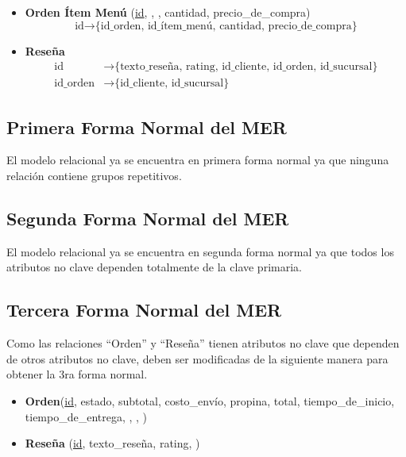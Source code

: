 \begin{itemize}
    \item \textbf{Orden Ítem Menú} (\underline{id}, , , cantidad, precio\_de\_compra)
    \[\text{id} \rightarrow \text{\{id\_orden, id\_ítem\_menú, cantidad, precio\_de\_compra\}}\]
    
    \item \textbf{Reseña}
    \begin{align*}
        \text{id} &\rightarrow \text{\{texto\_reseña, rating, id\_cliente, id\_orden, id\_sucursal\}} \\
        \text{id\_orden} &\rightarrow \text{\{id\_cliente, id\_sucursal\}}
    \end{align*}
\end{itemize}

\subsection{Primera Forma Normal del MER}

El modelo relacional ya se encuentra en primera forma normal ya que ninguna relación contiene grupos repetitivos.

\subsection{Segunda Forma Normal del MER}

El modelo relacional ya se encuentra en segunda forma normal ya que todos los atributos no clave dependen totalmente de la clave primaria.

\subsection{Tercera Forma Normal del MER}

Como las relaciones ``Orden'' y ``Reseña'' tienen atributos no clave que dependen de otros atributos no clave, deben ser modificadas de la siguiente manera para obtener la 3ra forma normal.

\begin{itemize}
    \item \textbf{Orden}(\underline{id}, estado, subtotal, costo\_envío, propina, total, tiempo\_de\_inicio, tiempo\_de\_entrega, , , )
    
    \item \textbf{Reseña} (\underline{id}, texto\_reseña, rating, )
\end{itemize}